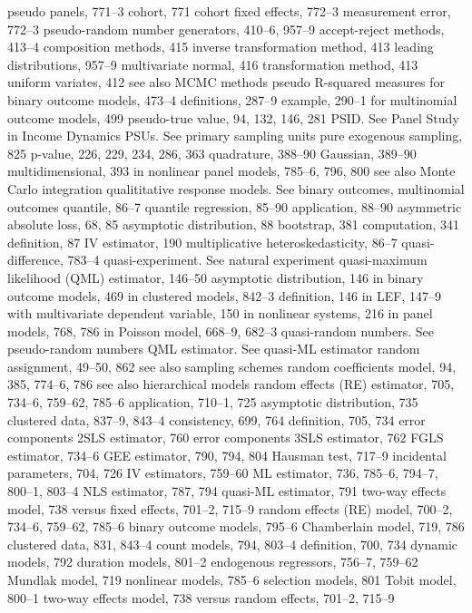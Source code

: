 pseudo panels, 771–3 cohort, 771
cohort fixed effects, 772–3 measurement error, 772–3
pseudo-random number generators, 410–6, 957–9 accept-reject methods, 413–4
composition methods, 415
inverse transformation method, 413
leading distributions, 957–9 multivariate normal, 416 transformation method, 413 uniform variates, 412
see also MCMC methods pseudo R-squared measures
for binary outcome models, 473–4 definitions, 287–9
example, 290–1
for multinomial outcome models, 499
pseudo-true value, 94, 132, 146, 281
PSID. See Panel Study in Income Dynamics PSUs. See primary sampling units
pure exogenous sampling, 825
p-value, 226, 229, 234, 286, 363
quadrature, 388–90
Gaussian, 389–90
multidimensional, 393
in nonlinear panel models, 785–6, 796, 800 see also Monte Carlo integration
qualititative response models. See binary outcomes, multinomial outcomes
quantile, 86–7
quantile regression, 85–90
application, 88–90
asymmetric absolute loss, 68, 85 asymptotic distribution, 88
bootstrap, 381
computation, 341
definition, 87
IV estimator, 190
multiplicative heteroskedasticity, 86–7
quasi-difference, 783–4
quasi-experiment. See natural experiment quasi-maximum likelihood (QML) estimator, 146–50
asymptotic distribution, 146
in binary outcome models, 469
in clustered models, 842–3
definition, 146
in LEF, 147–9
with multivariate dependent variable, 150 in nonlinear systems, 216
in panel models, 768, 786
in Poisson model, 668–9, 682–3
quasi-random numbers. See pseudo-random numbers QML estimator. See quasi-ML estimator
random assignment, 49–50, 862 see also sampling schemes
random coefficients model, 94, 385, 774–6, 786 see also hierarchical models
random effects (RE) estimator, 705, 734–6, 759–62, 785–6
application, 710–1, 725 asymptotic distribution, 735 clustered data, 837–9, 843–4 consistency, 699, 764 definition, 705, 734
error components 2SLS estimator, 760 error components 3SLS estimator, 762 FGLS estimator, 734–6
GEE estimator, 790, 794, 804 Hausman test, 717–9
incidental parameters, 704, 726
IV estimators, 759–60
ML estimator, 736, 785–6, 794–7, 800–1, 803–4 NLS estimator, 787, 794
quasi-ML estimator, 791
two-way effects model, 738
versus fixed effects, 701–2, 715–9
random effects (RE) model, 700–2, 734–6, 759–62, 785–6
binary outcome models, 795–6 Chamberlain model, 719, 786 clustered data, 831, 843–4 count models, 794, 803–4 definition, 700, 734
dynamic models, 792
duration models, 801–2
endogenous regressors, 756–7, 759–62 Mundlak model, 719
nonlinear models, 785–6
selection models, 801
Tobit model, 800–1
two-way effects model, 738
versus random effects, 701–2, 715–9
